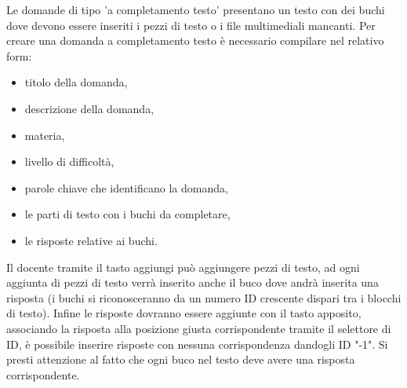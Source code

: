 \documentclass[a4paper, titlepage]{article}
\begin{document}
	 Le domande di tipo 'a completamento testo' presentano un testo con dei buchi dove devono essere inseriti i pezzi di testo o i file multimediali mancanti.
	 Per creare una domanda a completamento testo è necessario compilare nel relativo form:
	 \begin{itemize}
	 	\item titolo della domanda,
	 	\item descrizione della domanda,
	 	\item materia,
	 	\item livello di difficoltà,
	 	\item parole chiave che identificano la domanda,
	 	\item le parti di testo con i buchi da completare,
	 	\item le risposte relative ai buchi.
	 \end{itemize}
	 Il docente tramite il tasto aggiungi può aggiungere pezzi di testo, ad ogni aggiunta di pezzi di testo verrà inserito anche il buco dove andrà inserita una risposta (i buchi si riconosceranno da un numero ID crescente dispari tra i blocchi di testo). Infine le risposte dovranno essere aggiunte con il tasto apposito, associando la risposta alla posizione giusta corrispondente tramite il selettore di ID, è possibile inserire risposte con nessuna corrispondenza dandogli ID "-1". Si presti attenzione al fatto che ogni buco nel testo deve avere una risposta corrispondente.
	 
	 \newpage
\end{document}

